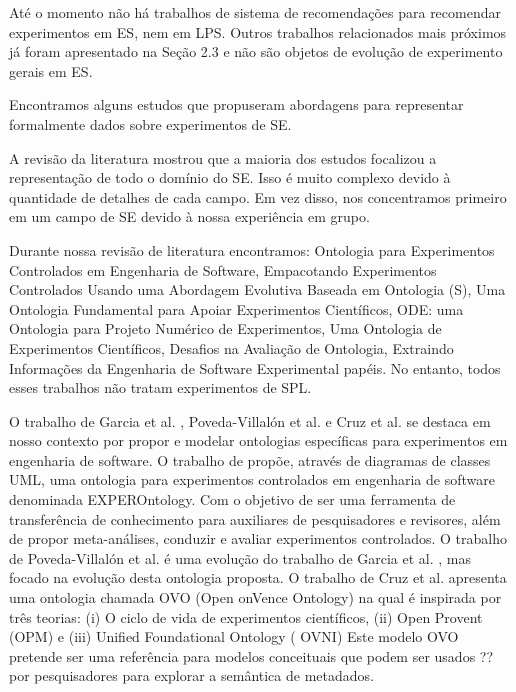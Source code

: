 Até o momento não há trabalhos de sistema de recomendações para recomendar experimentos em ES, nem em LPS. Outros trabalhos relacionados mais próximos já foram apresentado na Seção 2.3 e não são objetos de evolução de experimento gerais em ES.

Encontramos alguns estudos que propuseram abordagens para representar formalmente dados sobre experimentos de SE.

A revisão da literatura mostrou que a maioria dos estudos focalizou a representação de todo o domínio do SE. Isso é muito complexo devido à quantidade de detalhes de cada campo. Em vez disso, nos concentramos primeiro em um campo de SE devido à nossa experiência em grupo.

Durante nossa revisão de literatura encontramos: \cite{garcia2008ontology} Ontologia para Experimentos Controlados em Engenharia de Software, \cite{scatalon2011packaging} Empacotando Experimentos Controlados Usando uma Abordagem Evolutiva Baseada em Ontologia (S), \cite{da2012foundational} Uma Ontologia Fundamental para Apoiar Experimentos Científicos, \cite{blondet2016ode} ODE: uma Ontologia para Projeto Numérico de Experimentos, \cite{soldatova2006ontology} Uma Ontologia de Experimentos Científicos, \cite{gelernter2016challenges} Desafios na Avaliação de Ontologia, \cite{cruzes2007extracting} Extraindo Informações da Engenharia de Software Experimental papéis. No entanto, todos esses trabalhos não tratam experimentos de SPL.

O trabalho de Garcia et al. \cite{garcia2008ontology}, Poveda-Villalón et al. \cite{scatalon2011packaging} e Cruz et al. \cite{da2012foundational} se destaca em nosso contexto por propor e modelar ontologias específicas para experimentos em engenharia de software. O trabalho de \cite{garcia2008ontology} propõe, através de diagramas de classes UML, uma ontologia para experimentos controlados em engenharia de software denominada EXPEROntology. Com o objetivo de ser uma ferramenta de transferência de conhecimento para auxiliares de pesquisadores e revisores, além de propor meta-análises, conduzir e avaliar experimentos controlados. O trabalho de Poveda-Villalón et al. \cite{scatalon2011packaging} é uma evolução do trabalho de Garcia et al. \cite{garcia2008ontology}, mas focado na evolução desta ontologia proposta. O trabalho de Cruz et al. \cite{da2012foundational} apresenta uma ontologia chamada OVO (Open onVence Ontology) na qual é inspirada por três teorias: (i) O ciclo de vida de experimentos científicos, (ii) Open Provent (OPM) e (iii) Unified Foundational Ontology ( OVNI) Este modelo OVO pretende ser uma referência para modelos conceituais que podem ser usados ??por pesquisadores para explorar a semântica de metadados.

